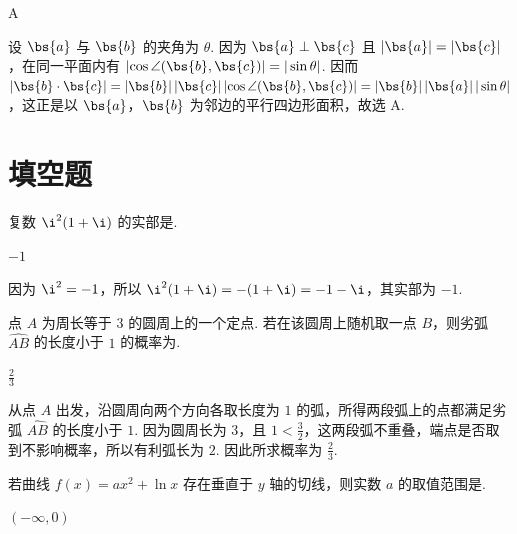\begin{answer}
A
\end{answer}

\begin{solution}
设 \(\bs{a}\) 与 \(\bs{b}\) 的夹角为 \(\theta\). 因为 \(\bs{a}\perp\bs{c}\) 且 \(|\bs{a}|=|\bs{c}|\)，在同一平面内有 \(\left|\cos\angle(\bs{b},\bs{c})\right|=|\sin\theta|\). 因而 \(|\bs{b}\cdot\bs{c}|=|\bs{b}|\,|\bs{c}|\left|\cos\angle(\bs{b},\bs{c})\right|=|\bs{b}|\,|\bs{a}|\,|\sin\theta|\)，这正是以 \(\bs{a}\)，\(\bs{b}\) 为邻边的平行四边形面积，故选 A.
\end{solution}

\section{填空题}

\begin{problem}
复数 \(\i^2 (1 + \i)\) 的实部是\fillinblank{}.
\end{problem}

\begin{answer}
\(-1\)
\end{answer}

\begin{solution}
因为 \(\i^2=-1\)，所以 \(\i^2(1+\i)=-(1+\i)=-1-\i\)，其实部为 \(-1\).
\end{solution}

\begin{problem}
点 \(A\) 为周长等于 \(3\) 的圆周上的一个定点. 若在该圆周上随机取一点 \(B\)，则劣弧 \(\widehat{AB}\) 的长度小于 \(1\) 的概率为\fillinblank{}.
\end{problem}

\begin{answer}
\(\frac{2}{3}\)
\end{answer}

\begin{solution}
从点 \(A\) 出发，沿圆周向两个方向各取长度为 \(1\) 的弧，所得两段弧上的点都满足劣弧 \(\widehat{AB}\) 的长度小于 \(1\). 因为圆周长为 \(3\)，且 \(1<\frac32\)，这两段弧不重叠，端点是否取到不影响概率，所以有利弧长为 \(2\). 因此所求概率为 \(\frac{2}{3}\).
\end{solution}

\begin{problem}
若曲线 \( f(x) = a x^2 + \ln x \) 存在垂直于 \( y \) 轴的切线，则实数 \( a \) 的取值范围是\fillinblank{}.
\end{problem}

\begin{answer}
\((-\infty,0)\)
\end{answer}


